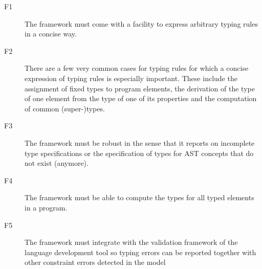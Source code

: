 \begin{description}
  \item[F1] The framework must come with a facility to express arbitrary typing
  rules in a concise way. 
  \item[F2] There are a few very common cases for typing rules for which a
  concise expression of typing rules is especially important. These include the 
  assignment of fixed types to program elements, the derivation of the type of one 
  element from the type of one of its properties and the computation of common (super-)types.
  \item[F3] The framework must be robust in the sense that it reports on
  incomplete type specifications or the specification of types for AST concepts
  that do not exist (anymore).
  \item[F4] The framework must be able to compute the types for all typed
  elements in a program. 
  \item[F5]  The framework must integrate with the validation framework of the
  language development tool so typing errors can be reported together with other
  constraint errors detected in the model
\end{description}




\endinput


Developing a compiler for a language \mv{It is not just the compiler. The whole
language definition must also be defined.} and its integration in Eclipse is
usually time consuming since it requires many phases, starting from parsing the
program, checking that is correct, up to the generation. Furthermore, these
mechanisms have to be integrated in the Eclipse IDE, which, in turn requires
more manual programming in order to provide background parsing of the program,
error marker generation, and all the tooling mechanisms to give the programmer a
good experience\mv{what is a good experience?}.  Xtext~\cite{xtext} is a
framework for language development based on Eclipse. It has successfully been
used for developing domain-specific languages (DSLs) as well as general-purpose
programming languages. It provides high-level mechanisms that significantly
simplify the development of the artifacts necessary for a fully-fledged IDE on
top of Eclipse.

